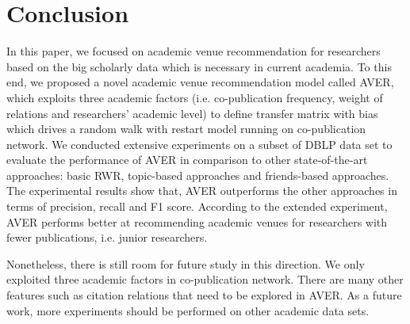 \documentclass{sig-alternate-2013}
\begin{document}
\section{Conclusion}
In this paper, we focused on academic venue recommendation for researchers based on the big scholarly data which is necessary in current academia. To this end, we proposed a novel academic venue recommendation model called AVER, which exploits three academic factors (i.e. co-publication frequency, weight of relations and researchers' academic level) to define transfer matrix with bias which drives a random walk with restart model running on co-publication network. We conducted extensive experiments on a subset of DBLP data set to evaluate the performance of AVER in comparison to other state-of-the-art approaches: basic RWR, topic-based approaches and friends-based approaches. The experimental results show that, AVER outperforms the other approaches in terms of precision, recall and F1 score. According to the extended experiment, AVER performs better at recommending academic venues for researchers with fewer publications, i.e. junior researchers.

Nonetheless, there is still room for future study in this direction. We only exploited three academic factors in co-publication network. There are many other features such as citation relations that need to be explored in AVER. As a future work, more experiments should be performed on other academic data sets.





\balancecolumns
\end{document}
